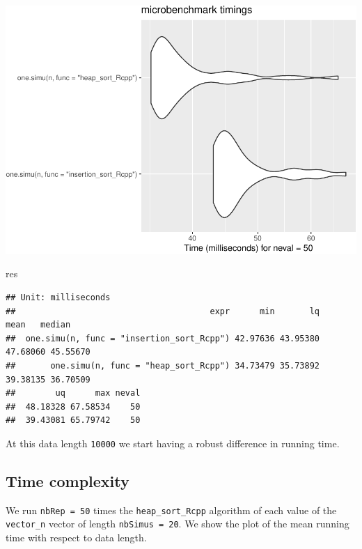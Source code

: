 \documentclass[
]{article}
\newenvironment{Shaded}{\begin{snugshade}}{\end{snugshade}}
\newcommand{\NormalTok}[1]{#1}
\begin{document}
\includegraphics{1_Sorting_analyse_files/figure-latex/unnamed-chunk-12-1.pdf}

\begin{Shaded}
\begin{Highlighting}[]
\NormalTok{res}
\end{Highlighting}
\end{Shaded}

\begin{verbatim}
## Unit: milliseconds
##                                       expr      min       lq     mean   median
##  one.simu(n, func = "insertion_sort_Rcpp") 42.97636 43.95380 47.68060 45.55670
##       one.simu(n, func = "heap_sort_Rcpp") 34.73479 35.73892 39.38135 36.70509
##        uq      max neval
##  48.18328 67.58534    50
##  39.43081 65.79742    50
\end{verbatim}

At this data length \texttt{10000} we start having a robust difference
in running time.

\subsection{Time complexity}\label{time-complexity}

We run \texttt{nbRep\ =\ 50} times the \texttt{heap\_sort\_Rcpp}
algorithm of each value of the \texttt{vector\_n} vector of length
\texttt{nbSimus\ =\ 20}. We show the plot of the mean running time with
respect to data length.
\end{document}
